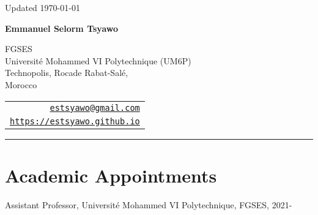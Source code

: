 \documentclass[12pt,letterpaper]{article}
\def\name{Emmanuel Selorm Tsyawo}
\renewenvironment{itemize}{
  \begin{list}{}{
    \setlength{\leftmargin}{1.5em}
  }
}{
  \end{list}
}
\begin{document}
\begin{minipage}{\linewidth}
  \begin{flushright}
    Updated \today
  \end{flushright}
\end{minipage}

\vspace{10pt}


\centerline{\huge \bf \name}

\vspace{0.25in}

\begin{minipage}{0.65\linewidth}
	FGSES\\
	Université Mohammed VI Polytechnique (UM6P)\\
  Technopolis, Rocade Rabat-Salé,\\
	Morocco \\
\end{minipage}
\begin{minipage}{0.5\linewidth}
  \begin{tabular}{r}
    \href{mailto:estsyawo@gmail.com}{\tt estsyawo@gmail.com} \\
    \href{https://estsyawo.github.io}{\tt https://estsyawo.github.io} \\
    
  \end{tabular}
\end{minipage}

\vspace{10pt}
\rule{\linewidth}{0.4pt}


\section*{Academic Appointments}
\begin{itemize}
  \item Assistant Professor, Universit\'e Mohammed VI Polytechnique, FGSES, 2021-
\end{itemize}
\end{document}
